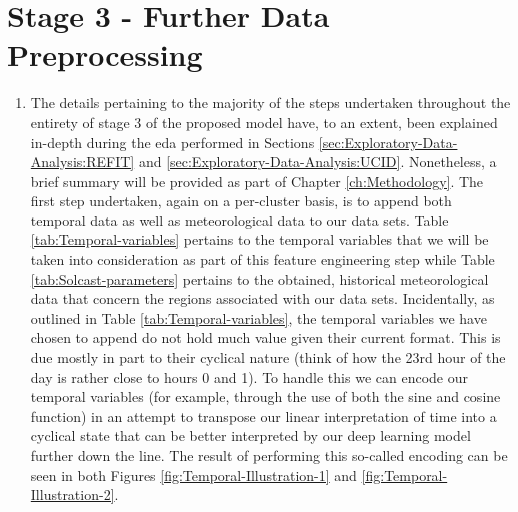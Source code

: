 \section{Stage 3 - Further Data Preprocessing}
\label{sec:Methodology:Stage-3}
\begin{adjustwidth}{-1.65cm}{-0.0cm}%
    \begin{enumerate}[label=Step 3.\arabic*:, leftmargin=*]
    \item The details pertaining to the majority of the steps undertaken throughout the entirety of stage 3 of the proposed model have, to an extent, been explained in-depth during the \gls{eda} performed in Sections \ref{sec:Exploratory-Data-Analysis:REFIT} and \ref{sec:Exploratory-Data-Analysis:UCID}. Nonetheless, a brief summary will be provided as part of Chapter \ref{ch:Methodology}. The first step undertaken, again on a per-cluster basis, is to append both temporal data as well as meteorological data to our data sets. Table \ref{tab:Temporal-variables} pertains to the temporal variables that we will be taken into consideration as part of this feature engineering step while Table \ref{tab:Solcast-parameters} pertains to the obtained, historical meteorological data that concern the regions associated with our data sets. Incidentally, as outlined in Table \ref{tab:Temporal-variables}, the temporal variables we have chosen to append do not hold much value given their current format. This is due mostly in part to their cyclical nature (think of how the 23rd hour of the day is rather close to hours 0 and 1). To handle this we can encode our temporal variables (for example, through the use of both the sine and cosine function) in an attempt to transpose our linear interpretation of time into a cyclical state that can be better interpreted by our deep learning model further down the line. The result of performing this so-called encoding can be seen in both Figures \ref{fig:Temporal-Illustration-1} and \ref{fig:Temporal-Illustration-2}.
    

\end{enumerate}
\end{adjustwidth}
